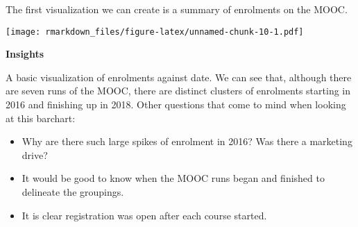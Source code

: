 \documentclass[
]{article}
\newenvironment{Shaded}{\begin{snugshade}}{\end{snugshade}}
\newcommand{\AttributeTok}[1]{\textcolor[rgb]{0.77,0.63,0.00}{#1}}
\newcommand{\CommentTok}[1]{\textcolor[rgb]{0.56,0.35,0.01}{\textit{#1}}}
\newcommand{\ConstantTok}[1]{\textcolor[rgb]{0.00,0.00,0.00}{#1}}
\newcommand{\DecValTok}[1]{\textcolor[rgb]{0.00,0.00,0.81}{#1}}
\newcommand{\FunctionTok}[1]{\textcolor[rgb]{0.00,0.00,0.00}{#1}}
\newcommand{\NormalTok}[1]{#1}
\newcommand{\OtherTok}[1]{\textcolor[rgb]{0.56,0.35,0.01}{#1}}
\newcommand{\SpecialCharTok}[1]{\textcolor[rgb]{0.00,0.00,0.00}{#1}}
\newcommand{\StringTok}[1]{\textcolor[rgb]{0.31,0.60,0.02}{#1}}
\begin{document}
The first visualization we can create is a summary of enrolments on the
MOOC.

\begin{Shaded}
\end{Shaded}

\texttt{[image: rmarkdown\_files/figure-latex/unnamed-chunk-10-1.pdf]}

\textbf{Insights}

A basic visualization of enrolments against date. We can see that,
although there are seven runs of the MOOC, there are distinct clusters
of enrolments starting in 2016 and finishing up in 2018. Other questions
that come to mind when looking at this barchart:

\begin{itemize}
\item
  Why are there such large spikes of enrolment in 2016? Was there a
  marketing drive?
\item
  It would be good to know when the MOOC runs began and finished to
  delineate the groupings.
\item
  It is clear registration was open after each course started.
\end{itemize}
\end{document}
